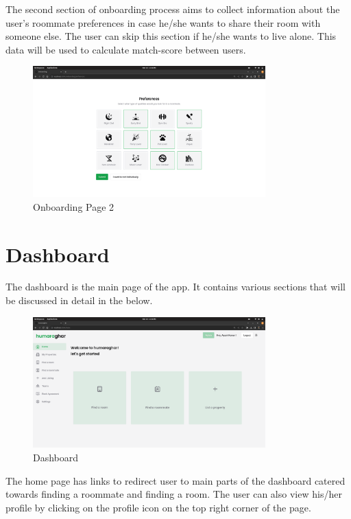 \par\noindent
The second section of onboarding process aims to collect information about the user's roommate preferences in case
he/she wants to share their room with someone else. The user can skip this section if he/she wants to live alone.
This data will be used to calculate match-score between users.\par
\begin{figure}[h]
    \centering
    \includegraphics[width=0.8\textwidth]{Images/screenshots/preferences.png}
    \caption{Onboarding Page 2}
\end{figure}
\clearpage

\section{Dashboard}
The dashboard is the main page of the app. It contains various sections that will be discussed in detail in the
below.
\begin{figure}[h]
    \centering
    \includegraphics[width=0.8\textwidth]{Images/screenshots/home.png}
    \caption{Dashboard}
\end{figure}

The home page has links to redirect user to main parts of the dashboard catered towards finding a roommate and finding
a room. The user can also view his/her profile by clicking on the profile icon on the top right corner of the page.

